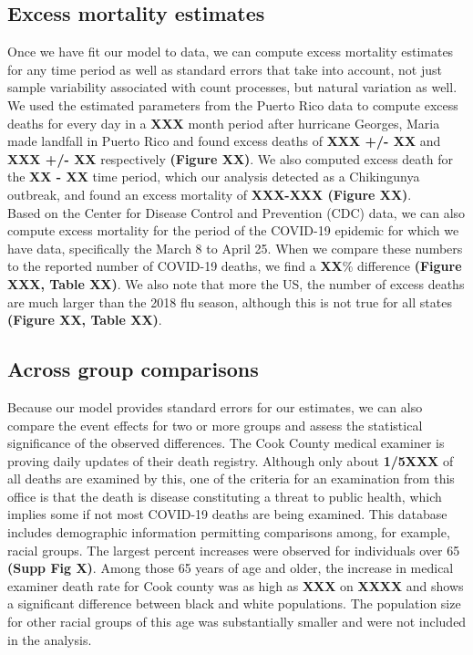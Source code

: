 \documentclass[11pt]{article}
\begin{document}
\subsection{Excess mortality estimates}
\label{subsec:excess-mortality}
Once we have fit our model to data, we can compute excess mortality estimates for any time period as well as standard errors that take into account, not just sample variability associated with count processes, but natural variation as well. We used the estimated parameters from the Puerto Rico data to compute excess deaths for every day in a \textbf{XXX} month period after hurricane Georges, Maria made landfall in Puerto Rico and found excess deaths of \textbf{XXX +/- XX} and \textbf{XXX +/- XX} respectively \textbf{(Figure XX)}. We also computed excess death for the \textbf{XX - XX} time period, which our analysis detected as a Chikingunya outbreak, and found an excess mortality of \textbf{XXX-XXX (Figure XX)}. \\ 

Based on the Center for Disease Control and Prevention (CDC) data, we can also compute excess mortality for the period of the COVID-19 epidemic for which we have data, specifically the March 8 to April 25. When we  compare these numbers to the reported number of COVID-19 deaths, we find a \textbf{XX}\% difference \textbf{(Figure XXX, Table XX)}. We also note that more the US, the number of excess deaths are much larger than the 2018 flu season, although this is not true for all states \textbf{(Figure XX, Table XX)}.

\subsection{Across group comparisons}
\label{subsec:group-comparison}
Because our model provides standard errors for our estimates, we can also compare the event effects for two or more groups and assess the statistical significance of the observed differences. The Cook County medical examiner is proving daily updates of their death registry. Although only about \textbf{1/5XXX} of all deaths are examined by this, one of the criteria for an examination from this office is that the death is disease constituting a threat to public health, which implies some if not most COVID-19 deaths are being examined. This database includes demographic information permitting comparisons among, for example, racial groups. The largest percent increases were observed for individuals over 65 \textbf{(Supp Fig X)}. Among those 65 years of age and older, the increase in medical examiner death rate for Cook county was as high as \textbf{XXX} on \textbf{XXXX} and shows a significant difference between black and white populations. The population size for other racial groups of this age was substantially smaller and were not included in the analysis.
 
\end{document}
